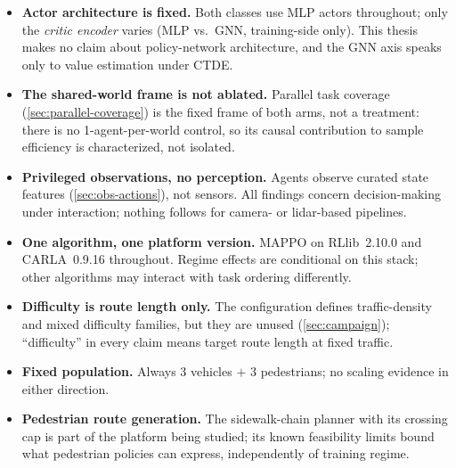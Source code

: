 \begin{itemize}
  \item \textbf{Actor architecture is fixed.} Both classes use MLP
        actors throughout; only the \emph{critic encoder} varies (MLP
        vs.\ GNN, training-side only). This thesis makes no claim about
        policy-network architecture, and the GNN axis speaks only to
        value estimation under CTDE.
  \item \textbf{The shared-world frame is not ablated.} Parallel task
        coverage (\cref{sec:parallel-coverage}) is the fixed frame of
        both arms, not a treatment: there is no 1-agent-per-world
        control, so its causal contribution to sample efficiency is
        characterized, not isolated.
  \item \textbf{Privileged observations, no perception.} Agents observe
        curated state features (\cref{sec:obs-actions}), not sensors.
        All findings concern decision-making under interaction;
        nothing follows for camera- or lidar-based pipelines.
  \item \textbf{One algorithm, one platform version.} MAPPO on
        RLlib~2.10.0 and CARLA~0.9.16 throughout. Regime effects are
        conditional on this stack; other algorithms may interact with
        task ordering differently.
  \item \textbf{Difficulty is route length only.} The configuration
        defines traffic-density and mixed difficulty families, but they
        are unused (\cref{sec:campaign}); ``difficulty'' in every claim
        means target route length at fixed traffic.
  \item \textbf{Fixed population.} Always 3 vehicles $+$ 3 pedestrians;
        no scaling evidence in either direction.
  \item \textbf{Pedestrian route generation.} The sidewalk-chain planner
        with its crossing cap is part of the platform being studied; its
        known feasibility limits bound what pedestrian policies can
        express, independently of training regime.
\end{itemize}
